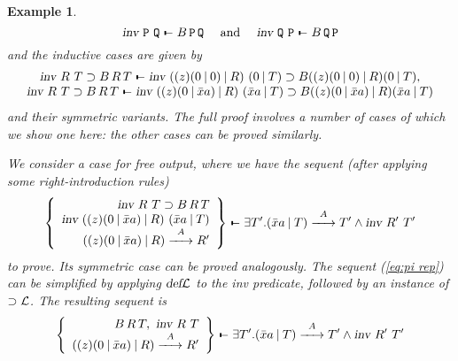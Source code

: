\documentclass{acmtrans2m}
\newenvironment{example}{\begin{exa} \rm}{\end{exa}}
\newtheorem{exa}[theorem]{Example}
\def\Ppi{{\mathtt P}}
\def\Qpi{{\mathtt Q}}
\def\relbar{\mathrel{\smash-}}
\def\joinrelm{\mathrel{\mkern-3.2mu}}
\def\tailpiece{\kern 1pt\vrule height 1ex width 0.3ex depth -.25ex}
\def\seqsym{\mathrel{\tailpiece\joinrelm\relbar}}
\newcommand{\Seq}[2]{#1\seqsym #2}
\newcommand{\defL}{\hbox{\sl def}{\cal L}}
\newcommand{\oimpL}{\oimp{\cal L}}
\newcommand{\oimp}{\supset}
\newcommand{\one  }[3]{#1\stackrel{#2}{-\!\!-\!\!\!\rightarrow    } #3}
\newcommand{\barpi}{\mathbin{|}}
\begin{document}
\begin{example}
$$
\Seq{\invar{\Ppi}{\Qpi}}{B\,\Ppi\,\Qpi} \quad \mbox{ and } \quad 
\Seq{\invar{\Qpi}{\Ppi}}{B\,\Qpi\,\Ppi}
$$
and the inductive cases are given by 
$$
\begin{array}{c}
\Seq{\invar{R}{T} \oimp B\,R\,T}
    {\invar{((z)(0\barpi 0)\barpi R)}{(0\barpi T)} \oimp B((z)(0\barpi 0)\barpi R)(0\barpi T),}\\
\Seq{\invar{R}{T} \oimp B\,R\,T}
    {\invar{((z)(0\barpi \bar{x}a)\barpi R)}{(\bar{x}a\barpi T)} 
    \oimp B((z)(0\barpi \bar{x}a)\barpi R)(\bar{x}a\barpi T)}
\end{array}
$$
and their symmetric variants.
The full proof involves a number of cases of which we show one here:
the other cases can be proved similarly.

We consider a case for free output, where we have the sequent (after applying
some right-introduction rules)
\begin{equation}
\Seq{
	\left\{
	\begin{array}{r}
	\invar{R}{T}\oimp B\,R\,T \\
	\invar{((z)(0\barpi \bar{x}a)\barpi R)}{(\bar{x}a\barpi T)}\\
	\one{((z)(0\barpi \bar{x}a)\barpi R)}{A}{R'}
	\end{array} \right\}
	}
	{
	\exists T'.\one{(\bar{x}a\barpi T)}{A}{T'} \land 
		\invar{R'}{T'}
	}
\label{eq:pi rep}		       
\end{equation}
to prove. 
Its symmetric case can be proved analogously. 
The sequent (\ref{eq:pi rep}) can be simplified by applying
$\defL$ to the {\sl inv} predicate, 
followed by an instance of $\oimpL$. The resulting sequent is
\begin{equation}
\Seq{
	\left\{
	\begin{array}{r}
	B\,R\,T, ~ \invar{R}{T}\\	
	\one{((z)(0\barpi \bar{x}a)\barpi R)}{A}{R'}
	\end{array} \right\}
	}
	{
	\exists T'.\one{(\bar{x}a\barpi T)}{A}{T'} \land 
		\invar{R'}{T'}
	}
\label{eq:pi rep2}
\end{equation}


\end{example}
\end{document}
